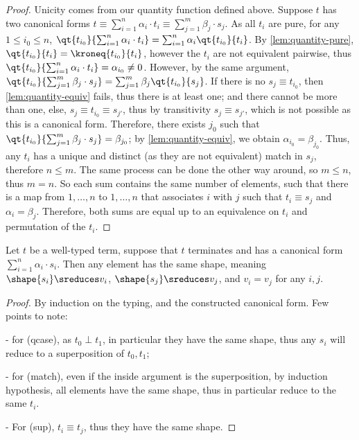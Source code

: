 \begin{proof}
  Unicity comes from our quantity function defined above.
  Suppose $t$ has two canonical forms $t \equiv \sum_{i=1}^n \alpha_i
  \cdot t_i \equiv \sum_{j=1}^m \beta_j \cdot s_j$.
  As all $t_i$ are pure, for any $1 \leq i_0 \leq n$, $\qt {t_{i_0}}
  {\sum_{i=1}^n \alpha_i \cdot t_i} = \sum_{i=1}^n \alpha_i \qt{t_{i_0}} {t_i}$.
  By \autoref{lem:quantity-pure}, $\qt{t_{i_0}} {t_i} = \kroneq
  {t_{i_0}} {t_i}$, however the $t_i$ are not equivalent pairwise,
  thus $\qt {t_{i_0}} {\sum_{i=1}^n \alpha_i \cdot t_i} = \alpha_{i_0} \neq 0$.
  However, by the same argument, $\qt{t_{i_0}}{\sum_{j=1}^m \beta_j
  \cdot s_j} = \sum_{j=1}^m \beta_j \qt{t_{i_0}} {s_j}$.
  If there is no $s_j \equiv t_{i_0}$, then
  \autoref{lem:quantity-equiv} fails, thus there is at least one;
  and there cannot be more than one, else, $s_j \equiv t_{i_0} \equiv
  s_{j'}$, thus by transitivity $s_j \equiv s_{j'}$, which is not
  possible as this is a canonical form.
  Therefore, there exists $j_0$ such that $\qt{t_{i_0}}{\sum_{j=1}^m
  \beta_j \cdot s_j} = \beta_{j_0}$;
  by \autoref{lem:quantity-equiv}, we obtain $\alpha_{i_0} = \beta_{j_0}$.
  Thus, any $t_i$ has a unique and distinct (as they are not
  equivalent) match in $s_j$, therefore $n \leq m$.
  The same process can be done the other way around, so $m \leq n$,
  thus $ m = n$.
  So each sum contains the same number of elements, such that there
  is a map from $1, \dots, n$ to $1, \dots, n$ that associates $i$
  with $j$ such that $t_i \equiv s_j$ and $\alpha_i = \beta_j$.
  Therefore, both sums are equal up to an equivalence on $t_i$ and
  permutation of the $t_i$. \qedhere
\end{proof}

\begin{lemma}\label{lem:canonical-shape}
  Let $t$ be a well-typed term, suppose that $t$ terminates
  and has a canonical form $\sum_{i=1}^n \alpha_i \cdot s_i$. Then
  any element has the same
  shape, meaning $\shape{s_i} \sreduces v_i$,
  $\shape{s_j} \sreduces v_j$, and $v_i = v_j$ for any $i, j$.
\end{lemma}

\begin{proof}
  By induction on the typing, and the constructed canonical form. Few
  points to note:

  - for (qcase), as $t_0 \perp t_1$, in particular they have the same shape,
  thus any $s_i$ will reduce to a superposition of $t_0, t_1$;

  - for (match), even if the inside argument is the superposition, by
  induction hypothesis,
  all elements have the same shape, thus in particular reduce to the same $t_i$.

  - For (sup), $t_i \equiv t_j$, thus they have the same shape. \qedhere
\end{proof}

